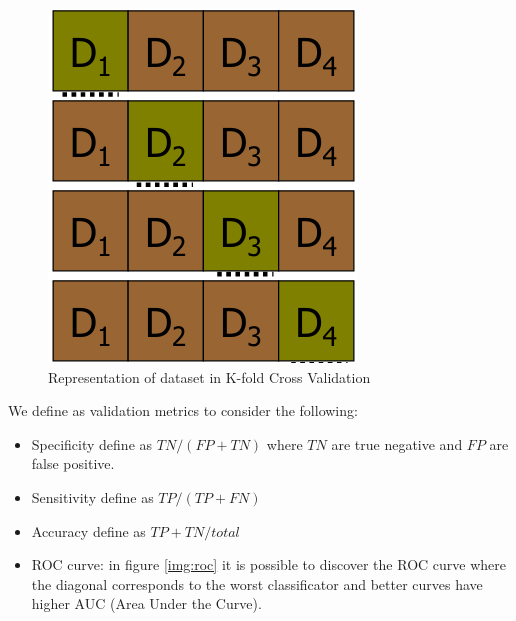 	\begin{figure}
	   \caption{Representation of dataset in K-fold Cross Validation}
	   \label{img:k-fold}
	   \includegraphics[width=\textwidth]{images/kfold}
	\end{figure}
	We define as validation metrics to consider the following:
	\begin{itemize}
	    \item Specificity define as $TN / (FP + TN)$ where $TN$ are true negative and $FP$ are false positive.
	    \item Sensitivity define as $TP / (TP + FN)$
	    \item Accuracy define as $TP + TN / total$
	    \item ROC curve: in figure \ref{img:roc} it is possible to discover the ROC curve where the diagonal corresponds to the 
		  worst classificator and better curves have higher AUC (Area Under the Curve).
	\end{itemize}

